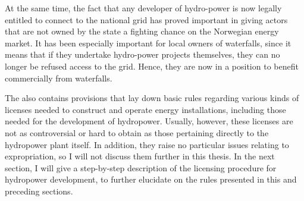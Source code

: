 At the same time, the fact that any developer of hydro-power is now legally entitled to connect to the national grid has proved important in giving actors that are not owned by the state a fighting chance on the Norwegian energy market. It has been especially important for local owners of waterfalls, since it means that if they undertake hydro-power projects themselves, they can no longer be refused access to the grid. Hence, they are now in a position to benefit commercially from waterfalls.

The \cite{ea90} also contains provisions that lay down basic rules regarding various kinds of licenses needed to construct and operate energy installations, including those needed for the development of hydropower. Usually, however, these licenses are not as controversial or hard to obtain as those pertaining directly to the hydropower plant itself. In addition, they raise no particular issues relating to expropriation, so I will not discuss them further in this thesis.  In the next section, I will give a step-by-step description of the licensing procedure for hydropower development, to further elucidate on the rules presented in this and preceding sections.

